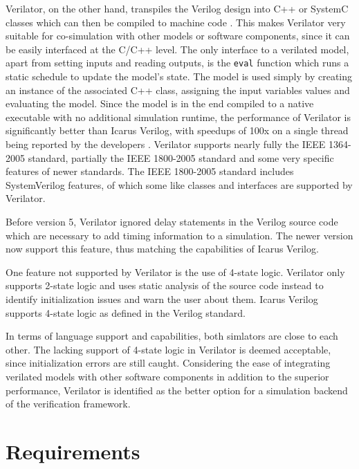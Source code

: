\documentclass[11pt,a4paper]{report}
\begin{document}
Verilator, on the other hand, transpiles the Verilog design into C++ or SystemC classes which can then be compiled
to machine code \cite{verilator}. This makes Verilator very suitable for co-simulation with other models
or software components, since it can be easily interfaced at the C/C++ level. The only interface to a verilated
model, apart from setting inputs and reading outputs, is the \texttt{eval} function which runs a static schedule to
update the model's state. The model is used simply by creating an instance of the associated C++ class, assigning the
input variables values and evaluating the model. Since the model is in the end compiled to a native executable with
no additional simulation
runtime, the performance of Verilator is significantly better than Icarus Verilog, with speedups of 100x on a single
thread being reported by the developers \cite{verilator}. Verilator supports nearly fully the IEEE 1364-2005
standard, partially the IEEE 1800-2005 standard and some very specific features of newer standards. The IEEE
1800-2005 standard includes SystemVerilog features, of which some like classes and interfaces are supported by Verilator.

Before version 5, Verilator ignored delay statements in the Verilog source code which are necessary to add timing
information to a simulation. The newer version now support this feature, thus matching the capabilities of Icarus Verilog.

One feature not supported by Verilator is the use of 4-state logic. Verilator only supports 2-state logic and uses
static analysis of the source code instead to identify initialization issues and warn the user about them. Icarus
Verilog supports 4-state logic as defined in the Verilog standard.

In terms of language support and capabilities, both simlators are close to each other. The lacking support of 4-state
logic in Verilator is deemed acceptable, since initialization errors are still caught. Considering the ease of
integrating verilated models with other software components in addition to the
superior performance, Verilator is identified as the better option for a simulation backend of the verification framework.

\section{Requirements} %
\end{document}
